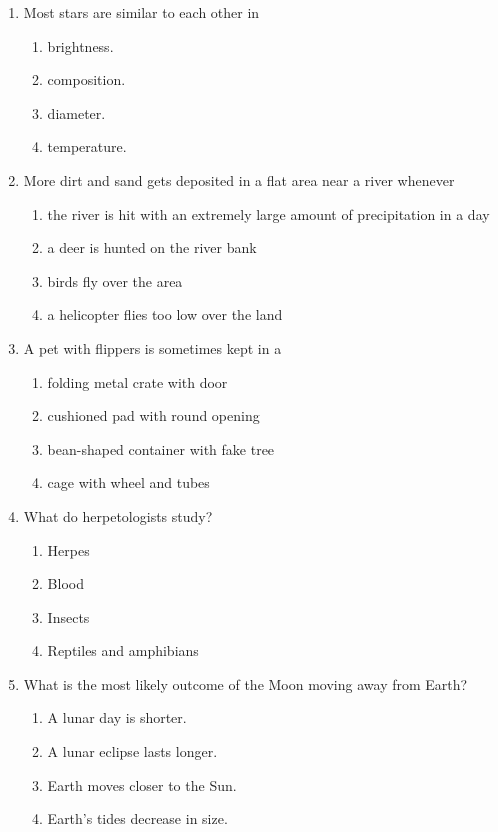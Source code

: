 \documentclass[12pt]{article}
\begin{document}
\begin{enumerate}[label=\arabic*.]
\item Most stars are similar to each other in
\begin{enumerate}[label=(\alph*)]
    \item brightness.
    \item composition.
    \item diameter.
    \item temperature.
\end{enumerate}
\item More dirt and sand gets deposited in a flat area near a river whenever
\begin{enumerate}[label=(\alph*)]
    \item the river is hit with an extremely large amount of precipitation in a day
    \item a deer is hunted on the river bank
    \item birds fly over the area
    \item a helicopter flies too low over the land
\end{enumerate}
\item A pet with flippers is sometimes kept in a
\begin{enumerate}[label=(\alph*)]
    \item folding metal crate with door
    \item cushioned pad with round opening
    \item bean-shaped container with fake tree
    \item cage with wheel and tubes
\end{enumerate}
\item What do herpetologists study?
\begin{enumerate}[label=(\alph*)]
    \item Herpes
    \item Blood
    \item Insects
    \item Reptiles and amphibians
\end{enumerate}
\item What is the most likely outcome of the Moon moving away from Earth?
\begin{enumerate}[label=(\alph*)]
    \item A lunar day is shorter.
    \item A lunar eclipse lasts longer.
    \item Earth moves closer to the Sun.
    \item Earth's tides decrease in size.
\end{enumerate}

\end{enumerate}
\end{document}
